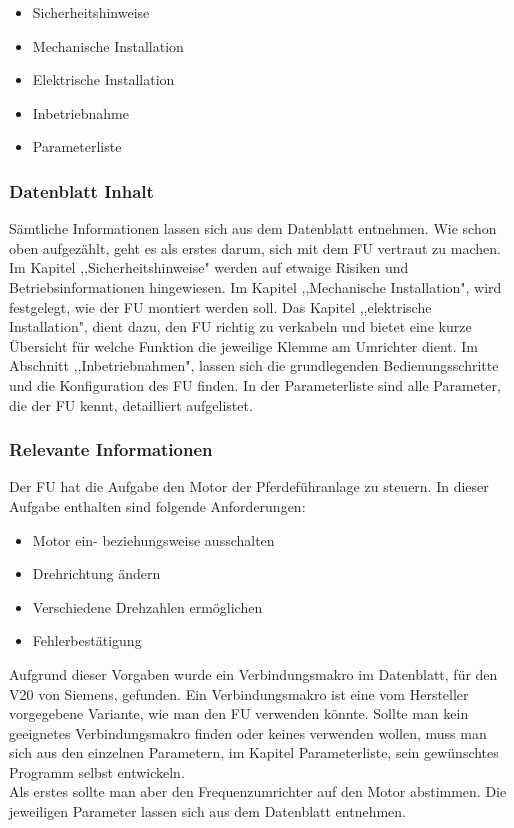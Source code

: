 \begin{itemize}
	\item{Sicherheitshinweise}
	\item{Mechanische Installation}
	\item{Elektrische Installation}
	\item{Inbetriebnahme}
	\item{Parameterliste}
\end{itemize}

\subsubsection{Datenblatt Inhalt}
\label{sec:datenblattinhalt}

Sämtliche Informationen lassen sich aus dem Datenblatt entnehmen. Wie schon oben aufgezählt, geht es als erstes darum, sich mit dem \ac{FU} vertraut zu machen. Im  Kapitel ,,Sicherheitshinweise" werden auf etwaige Risiken und Betriebsinformationen hingewiesen. Im Kapitel ,,Mechanische Installation", wird festgelegt, wie der \ac{FU} montiert werden soll. Das Kapitel ,,elektrische Installation", dient dazu, den \ac{FU} richtig zu verkabeln und bietet eine kurze Übersicht für welche Funktion die jeweilige Klemme am Umrichter dient. Im Abschnitt ,,Inbetriebnahmen", lassen sich die grundlegenden Bedienungsschritte und die Konfiguration des \ac{FU} finden. In der Parameterliste sind alle Parameter, die der \ac{FU} kennt, detailliert aufgelistet.

\subsubsection{Relevante Informationen}
\label{sec:relevanteInformationen}

Der \ac{FU} hat die Aufgabe den Motor der Pferdeführanlage zu steuern. In dieser Aufgabe enthalten sind folgende Anforderungen:

\begin{itemize}
	\item{Motor ein- beziehungsweise ausschalten}
	\item{Drehrichtung ändern}
	\item{Verschiedene Drehzahlen ermöglichen}
	\item{Fehlerbestätigung}
\end{itemize}

Aufgrund dieser Vorgaben wurde ein Verbindungsmakro im Datenblatt, für den V20 von Siemens, gefunden. 
Ein Verbindungsmakro ist eine vom Hersteller vorgegebene Variante, wie man den \ac{FU} verwenden könnte. Sollte man kein geeignetes Verbindungsmakro finden oder keines verwenden wollen, muss man sich aus den einzelnen Parametern, im Kapitel Parameterliste, sein gewünschtes Programm selbst entwickeln. \\
Als erstes sollte man aber den Frequenzumrichter auf den Motor abstimmen. Die jeweiligen Parameter lassen sich aus dem Datenblatt entnehmen. 

